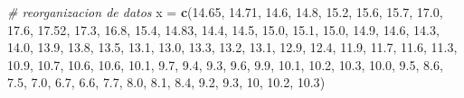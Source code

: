 \documentclass[]{article}
\newenvironment{Shaded}{\begin{snugshade}}{\end{snugshade}}
\newcommand{\KeywordTok}[1]{\textcolor[rgb]{0.13,0.29,0.53}{\textbf{#1}}}
\newcommand{\DecValTok}[1]{\textcolor[rgb]{0.00,0.00,0.81}{#1}}
\newcommand{\FloatTok}[1]{\textcolor[rgb]{0.00,0.00,0.81}{#1}}
\newcommand{\StringTok}[1]{\textcolor[rgb]{0.31,0.60,0.02}{#1}}
\newcommand{\CommentTok}[1]{\textcolor[rgb]{0.56,0.35,0.01}{\textit{#1}}}
\newcommand{\NormalTok}[1]{#1}
\begin{document}
\begin{Shaded}
\begin{Highlighting}[]
\CommentTok{# reorganizacion de datos }
\NormalTok{x =}\StringTok{ }\KeywordTok{c}\NormalTok{(}\FloatTok{14.65}\NormalTok{, }\FloatTok{14.71}\NormalTok{, }\FloatTok{14.6}\NormalTok{, }\FloatTok{14.8}\NormalTok{, }\FloatTok{15.2}\NormalTok{, }\FloatTok{15.6}\NormalTok{, }\FloatTok{15.7}\NormalTok{, }\FloatTok{17.0}\NormalTok{, }\FloatTok{17.6}\NormalTok{, }\FloatTok{17.52}\NormalTok{, }\FloatTok{17.3}\NormalTok{, }
  \FloatTok{16.8}\NormalTok{, }\FloatTok{15.4}\NormalTok{, }\FloatTok{14.83}\NormalTok{, }\FloatTok{14.4}\NormalTok{, }\FloatTok{14.5}\NormalTok{, }
  \FloatTok{15.0}\NormalTok{, }\FloatTok{15.1}\NormalTok{, }\FloatTok{15.0}\NormalTok{, }\FloatTok{14.9}\NormalTok{, }\FloatTok{14.6}\NormalTok{, }\FloatTok{14.3}\NormalTok{, }\FloatTok{14.0}\NormalTok{, }\FloatTok{13.9}\NormalTok{, }\FloatTok{13.8}\NormalTok{, }\FloatTok{13.5}\NormalTok{, }\FloatTok{13.1}\NormalTok{, }\FloatTok{13.0}\NormalTok{, }
  \FloatTok{13.3}\NormalTok{, }\FloatTok{13.2}\NormalTok{, }\FloatTok{13.1}\NormalTok{, }\FloatTok{12.9}\NormalTok{, }\FloatTok{12.4}\NormalTok{, }\FloatTok{11.9}\NormalTok{, }\FloatTok{11.7}\NormalTok{, }\FloatTok{11.6}\NormalTok{, }\FloatTok{11.3}\NormalTok{, }\FloatTok{10.9}\NormalTok{, }
  \FloatTok{10.7}\NormalTok{, }\FloatTok{10.6}\NormalTok{, }\FloatTok{10.6}\NormalTok{, }\FloatTok{10.1}\NormalTok{, }\FloatTok{9.7}\NormalTok{, }\FloatTok{9.4}\NormalTok{, }\FloatTok{9.3}\NormalTok{, }\FloatTok{9.6}\NormalTok{, }\FloatTok{9.9}\NormalTok{, }\FloatTok{10.1}\NormalTok{, }\FloatTok{10.2}\NormalTok{, }\FloatTok{10.3}\NormalTok{,  }\FloatTok{10.0}\NormalTok{, }\FloatTok{9.5}\NormalTok{, }
  \FloatTok{8.6}\NormalTok{, }\FloatTok{7.5}\NormalTok{, }\FloatTok{7.0}\NormalTok{, }\FloatTok{6.7}\NormalTok{, }\FloatTok{6.6}\NormalTok{, }\FloatTok{7.7}\NormalTok{, }
  \FloatTok{8.0}\NormalTok{, }\FloatTok{8.1}\NormalTok{, }\FloatTok{8.4}\NormalTok{, }\FloatTok{9.2}\NormalTok{, }\FloatTok{9.3}\NormalTok{, }\DecValTok{10}\NormalTok{, }\FloatTok{10.2}\NormalTok{, }\FloatTok{10.3}\NormalTok{)}


\end{Highlighting}
\end{Shaded}
\end{document}
